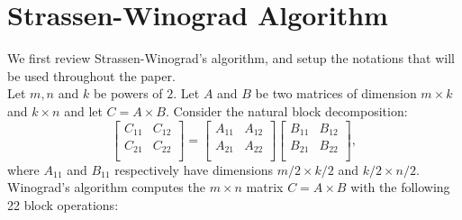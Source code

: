 \documentclass{article}
\begin{document}
\section{Strassen-Winograd Algorithm}\label{sec:algo}
We first review Strassen-Winograd's algorithm, and setup the notations that
will be used throughout the paper.\\
Let $m,n$ and $k$ be powers of $2$.
Let $A$ and $B$ be two matrices of dimension $m\times k$ and $k\times n$ and
let $C=A\times B$.
Consider the natural block decomposition:
$$
\begin{bmatrix}
  C_{11} & C_{12}\\
  C_{21} & C_{22}\\
\end{bmatrix}
=
\begin{bmatrix}
  A_{11} & A_{12}\\
  A_{21} & A_{22}\\
\end{bmatrix}
\begin{bmatrix}
  B_{11} & B_{12}\\
  B_{21} & B_{22}\\
\end{bmatrix},
$$
where $A_{11}$ and $B_{11}$ respectively have dimensions $m/2 \times k/2$ and $k/2
\times n/2$.
Winograd's algorithm computes the $m\times n$ matrix $C=A\times B$ with the
following 22 block operations:\\
\end{document}
